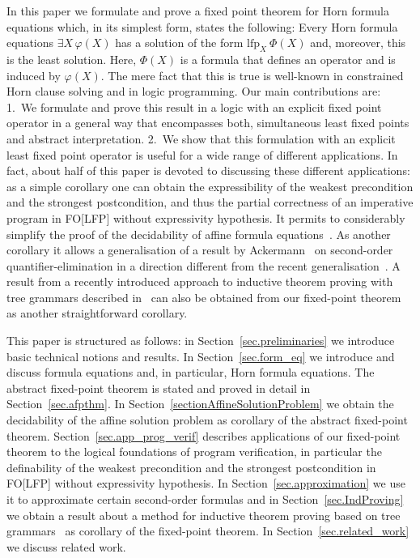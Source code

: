 \documentclass[acmsmall]{acmart}
\theoremstyle{plain}
\theoremstyle{definition}
\newcommand{\lfp}{\mathrm{lfp}} %
\begin{document}
In this paper we formulate and prove a fixed point theorem for
 Horn formula equations which, in its simplest form, states the following:
Every Horn formula equations $\exists X\, \varphi(X)$ has a solution of the
 form $\lfp_{X}~\Phi(X)$ and, moreover, this is the least solution.
Here, $\Phi(X)$ is a formula that defines an operator and is induced by $\varphi(X)$.
The mere fact that this is true is well-known in constrained Horn clause solving
 and in logic programming.
Our main contributions are: 1.~We formulate and prove this result in a logic
 with an explicit fixed
 point operator in a general way that encompasses both, simultaneous least fixed points
 and  abstract interpretation.
2.~We show that this formulation with an explicit least fixed point operator is useful
 for a wide range of different applications.
In fact, about half of this paper is devoted to discussing these different applications:
as a simple corollary one can obtain the expressibility of the
 weakest precondition and the strongest postcondition, and thus the partial correctness of an imperative
 program in FO[LFP] without expressivity hypothesis.
It permits to considerably simplify the proof of the decidability of affine formula equations~\cite{Hetzl20Decidability}.
As another corollary it allows a generalisation of a result by
 Ackermann~\cite{Ackermann35Untersuchungen} on second-order quantifier-elimination in a direction different
 from the recent generalisation~\cite{Wernhard17Approximating}.
A result from a recently introduced approach to inductive theorem proving with tree grammars described
 in~\cite{Eberhard15Inductive} can also be obtained from our fixed-point theorem as another straightforward corollary.

This paper is structured as follows: in Section~\ref{sec.preliminaries} we introduce
 basic technical notions and results.
In Section~\ref{sec.form_eq} we introduce and discuss formula equations and, in particular, Horn
 formula equations.
The abstract fixed-point theorem is stated and proved in detail in Section~\ref{sec.afpthm}.
In Section~\ref{sectionAffineSolutionProblem} we obtain the decidability of the affine solution
 problem as corollary of the abstract fixed-point theorem.
Section~\ref{sec.app_prog_verif} describes applications of our fixed-point theorem to the logical foundations of program verification,
 in particular the definability of the weakest precondition and the strongest postcondition in FO[LFP] without
 expressivity hypothesis.
In Section~\ref{sec.approximation} we use it to approximate certain second-order formulas
 and in Section~\ref{sec.IndProving} we obtain a result about a method for inductive theorem proving
 based on tree grammars~\cite{Eberhard15Inductive} as corollary of the fixed-point theorem.
In Section~\ref{sec.related_work} we discuss related work.
\end{document}
